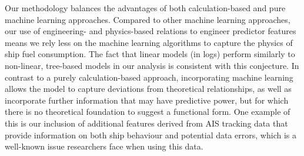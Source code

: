 

Our methodology balances the advantages of both calculation-based and pure machine learning approaches. Compared to other machine learning approaches, our use of engineering- and physics-based relations to engineer predictor features means we rely less on the machine learning algorithms to capture the physics of ship fuel consumption. The fact that linear models (in logs) perform similarly to non-linear, tree-based models in our analysis is consistent with this conjecture. In contrast to a purely calculation-based approach, incorporating machine learning allows the model to capture deviations from theoretical relationships, as well as incorporate further information that may have predictive power, but for which there is no theoretical foundation to suggest a functional form. One example of this is our inclusion of additional features derived from \ac{AIS} tracking data that provide information on both ship behaviour and potential data errors, which is a well-known issue researchers face when using this data.

